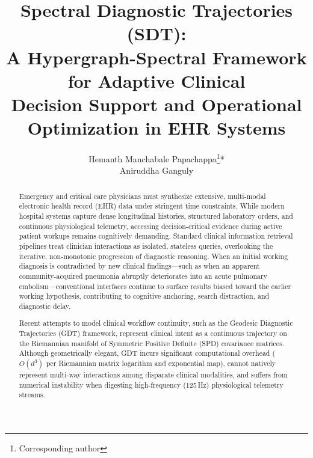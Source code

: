 \documentclass[10pt, onecolumn]{article}
\begin{document}
\title{%
  \textbf{Spectral Diagnostic Trajectories (SDT):}\\[4pt]
  \large A Hypergraph-Spectral Framework for Adaptive Clinical\\
  Decision Support and Operational Optimization in EHR Systems
}

\author{
Hemanth Manchabale Papachappa\thanks{Corresponding author}* \\
Aniruddha Ganguly
}



\date{}
\maketitle

\begin{abstract}
\noindent
Emergency and critical care physicians must synthesize extensive, multi-modal electronic health record (EHR) data under stringent time constraints. While modern hospital systems capture dense longitudinal histories, structured laboratory orders, and continuous physiological telemetry, accessing decision-critical evidence during active patient workups remains cognitively demanding. Standard clinical information retrieval pipelines treat clinician interactions as isolated, stateless queries, overlooking the iterative, non-monotonic progression of diagnostic reasoning. When an initial working diagnosis is contradicted by new clinical findings---such as when an apparent community-acquired pneumonia abruptly deteriorates into an acute pulmonary embolism---conventional interfaces continue to surface results biased toward the earlier working hypothesis, contributing to cognitive anchoring, search distraction, and diagnostic delay.

Recent attempts to model clinical workflow continuity, such as the Geodesic Diagnostic Trajectories (GDT) framework, represent clinical intent as a continuous trajectory on the Riemannian manifold of Symmetric Positive Definite (SPD) covariance matrices. Although geometrically elegant, GDT incurs significant computational overhead ($O(d^3)$ per Riemannian matrix logarithm and exponential map), cannot natively represent multi-way interactions among disparate clinical modalities, and suffers from numerical instability when digesting high-frequency (125\,Hz) physiological telemetry streams.


\end{abstract}
\end{document}
